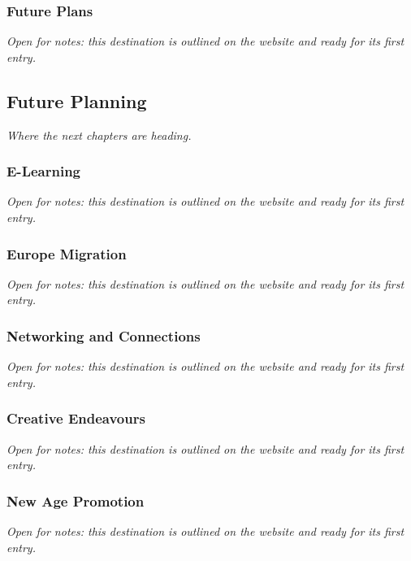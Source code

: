 \documentclass{article}
\begin{document}
\subsubsection{Future Plans}\label{sec:future-plans}
\textit{Open for notes: this destination is outlined on the website and ready for its first entry.}

\subsection{Future Planning}\label{sec:future-planning}
\textit{Where the next chapters are heading.}

\subsubsection{E-Learning}\label{sec:e-learning}
\textit{Open for notes: this destination is outlined on the website and ready for its first entry.}

\subsubsection{Europe Migration}\label{sec:europe-migration}
\textit{Open for notes: this destination is outlined on the website and ready for its first entry.}

\subsubsection{Networking and Connections}\label{sec:networking-and-connections}
\textit{Open for notes: this destination is outlined on the website and ready for its first entry.}

\subsubsection{Creative Endeavours}\label{sec:creative-endeavours}
\textit{Open for notes: this destination is outlined on the website and ready for its first entry.}

\subsubsection{New Age Promotion}\label{sec:new-age-promotion}
\textit{Open for notes: this destination is outlined on the website and ready for its first entry.}
\end{document}
